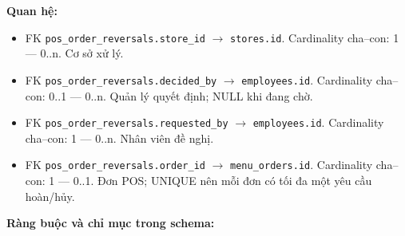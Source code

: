 \textbf{Quan hệ:}

\begin{itemize}

\item FK \texttt{pos\_order\_reversals.store\_id} $\rightarrow$ \texttt{stores.id}. Cardinality cha--con: 1 — 0..n. Cơ sở xử lý.

\item FK \texttt{pos\_order\_reversals.decided\_by} $\rightarrow$ \texttt{employees.id}. Cardinality cha--con: 0..1 — 0..n. Quản lý quyết định; NULL khi đang chờ.

\item FK \texttt{pos\_order\_reversals.requested\_by} $\rightarrow$ \texttt{employees.id}. Cardinality cha--con: 1 — 0..n. Nhân viên đề nghị.

\item FK \texttt{pos\_order\_reversals.order\_id} $\rightarrow$ \texttt{menu\_orders.id}. Cardinality cha--con: 1 — 0..1. Đơn POS; UNIQUE nên mỗi đơn có tối đa một yêu cầu hoàn/hủy.

\end{itemize}

\textbf{Ràng buộc và chỉ mục trong schema:}

